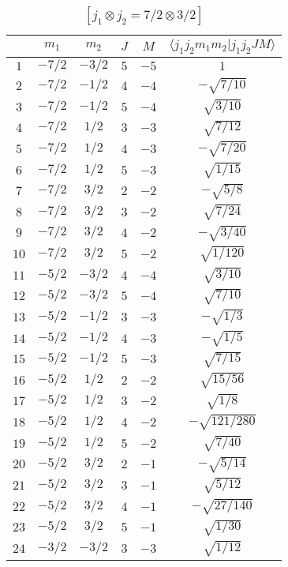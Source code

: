 \begin{table}
\tiny
\caption{$[j_1 \otimes j_2 = 7/2 \otimes 3/2]$}
\begin{center}
\begin{tabular}{|c|c|c|c|c|c|}
\hline 
   & $m_1$ & $m_2$ & $J$ & $M$ & $\langle j_1 j_2 m_1 m_2 | j_1 j_2 J M \rangle$ \\ 
\hline 
$1$ & $-7/2$ & $-3/2$ & $5$ & $-5$ & $1$ \\ 
$2$ & $-7/2$ & $-1/2$ & $4$ & $-4$ & $-\sqrt{7/10}$ \\ 
$3$ & $-7/2$ & $-1/2$ & $5$ & $-4$ & $\sqrt{3/10}$ \\ 
$4$ & $-7/2$ & $1/2$ & $3$ & $-3$ & $\sqrt{7/12}$ \\ 
$5$ & $-7/2$ & $1/2$ & $4$ & $-3$ & $-\sqrt{7/20}$ \\ 
$6$ & $-7/2$ & $1/2$ & $5$ & $-3$ & $\sqrt{1/15}$ \\ 
$7$ & $-7/2$ & $3/2$ & $2$ & $-2$ & $-\sqrt{5/8}$ \\ 
$8$ & $-7/2$ & $3/2$ & $3$ & $-2$ & $\sqrt{7/24}$ \\ 
$9$ & $-7/2$ & $3/2$ & $4$ & $-2$ & $-\sqrt{3/40}$ \\ 
$10$ & $-7/2$ & $3/2$ & $5$ & $-2$ & $\sqrt{1/120}$ \\ 
$11$ & $-5/2$ & $-3/2$ & $4$ & $-4$ & $\sqrt{3/10}$ \\ 
$12$ & $-5/2$ & $-3/2$ & $5$ & $-4$ & $\sqrt{7/10}$ \\ 
$13$ & $-5/2$ & $-1/2$ & $3$ & $-3$ & $-\sqrt{1/3}$ \\ 
$14$ & $-5/2$ & $-1/2$ & $4$ & $-3$ & $-\sqrt{1/5}$ \\ 
$15$ & $-5/2$ & $-1/2$ & $5$ & $-3$ & $\sqrt{7/15}$ \\ 
$16$ & $-5/2$ & $1/2$ & $2$ & $-2$ & $\sqrt{15/56}$ \\ 
$17$ & $-5/2$ & $1/2$ & $3$ & $-2$ & $\sqrt{1/8}$ \\ 
$18$ & $-5/2$ & $1/2$ & $4$ & $-2$ & $-\sqrt{121/280}$ \\ 
$19$ & $-5/2$ & $1/2$ & $5$ & $-2$ & $\sqrt{7/40}$ \\ 
$20$ & $-5/2$ & $3/2$ & $2$ & $-1$ & $-\sqrt{5/14}$ \\ 
$21$ & $-5/2$ & $3/2$ & $3$ & $-1$ & $\sqrt{5/12}$ \\ 
$22$ & $-5/2$ & $3/2$ & $4$ & $-1$ & $-\sqrt{27/140}$ \\ 
$23$ & $-5/2$ & $3/2$ & $5$ & $-1$ & $\sqrt{1/30}$ \\ 
$24$ & $-3/2$ & $-3/2$ & $3$ & $-3$ & $\sqrt{1/12}$ \\ 

\end{tabular}
\end{center}
\end{table}
